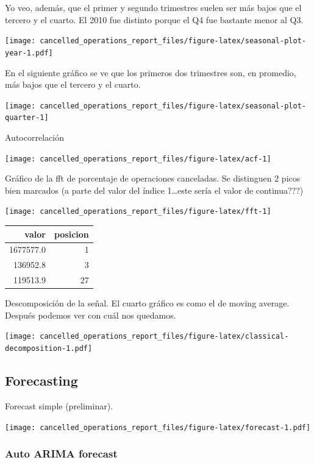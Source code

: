 \documentclass[
]{article}
\begin{document}
Yo veo, además, que el primer y segundo trimestres suelen ser más bajos
que el tercero y el cuarto. El 2010 fue distinto porque el Q4 fue
bastante menor al Q3.

\texttt{[image: cancelled\_operations\_report\_files/figure-latex/seasonal-plot-year-1.pdf]}

En el siguiente gráfico se ve que los primeros dos trimestres son, en
promedio, más bajos que el tercero y el cuarto.

\begin{center}\texttt{[image: cancelled\_operations\_report\_files/figure-latex/seasonal-plot-quarter-1]} \end{center}

Autocorrelación

\begin{center}\texttt{[image: cancelled\_operations\_report\_files/figure-latex/acf-1]} \end{center}

Gráfico de la fft de porcentaje de operaciones canceladas. Se distinguen
2 picos bien marcados (a parte del valor del índice 1\ldots este sería
el valor de continua???)

\begin{center}\texttt{[image: cancelled\_operations\_report\_files/figure-latex/fft-1]} \end{center}

\begin{longtable}[]{@{}rr@{}}
\toprule
valor & posicion\tabularnewline
\midrule
\endhead
1677577.0 & 1\tabularnewline
136952.8 & 3\tabularnewline
119513.9 & 27\tabularnewline
\bottomrule
\end{longtable}

Descomposición de la señal. El cuarto gráfico es como el de moving
average. Después podemos ver con cuál nos quedamos.

\texttt{[image: cancelled\_operations\_report\_files/figure-latex/classical-decomposition-1.pdf]}

\hypertarget{forecasting}{%
\subsection{Forecasting}\label{forecasting}}

Forecast simple (preliminar).

\texttt{[image: cancelled\_operations\_report\_files/figure-latex/forecast-1.pdf]}

\hypertarget{auto-arima-forecast}{%
\subsubsection{Auto ARIMA forecast}\label{auto-arima-forecast}}
\end{document}
